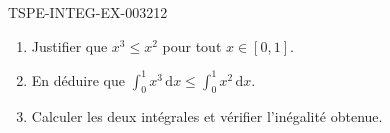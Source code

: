 \begin{exercice}{TSPE-INTEG-EX-003}{2}{12}
\begin{enumerate}
  \item Justifier que $x^3 \leq x^2$ pour tout $x \in [0,1]$.
  \item En déduire que $\displaystyle\int_0^1 x^3\,\mathrm{d}x \leq \int_0^1 x^2\,\mathrm{d}x$.
  \item Calculer les deux intégrales et vérifier l'inégalité obtenue.
\end{enumerate}
\end{exercice}
